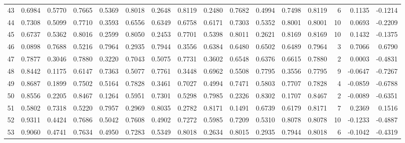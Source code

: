 \begin{tabular}{lrrrrrrrrrrrrrrr}
43  &      0.6984 &  0.5770 &  0.7665 &  0.5369 &  0.8018 &  0.2648 &  0.8119 &  0.2480 &  0.7682 &  0.4994 &   0.7498 &     0.8119 &      6 &                    0.1135 &                    -0.1214 \\
44  &      0.7308 &  0.5099 &  0.7710 &  0.3593 &  0.6556 &  0.6349 &  0.6758 &  0.6171 &  0.7303 &  0.5352 &   0.8001 &     0.8001 &     10 &                    0.0693 &                    -0.2209 \\
45  &      0.6737 &  0.5362 &  0.8016 &  0.2599 &  0.8050 &  0.2453 &  0.7701 &  0.5398 &  0.8011 &  0.2621 &   0.8169 &     0.8169 &     10 &                    0.1432 &                    -0.1375 \\
46  &      0.0898 &  0.7688 &  0.5216 &  0.7964 &  0.2935 &  0.7944 &  0.3556 &  0.6384 &  0.6480 &  0.6502 &   0.6489 &     0.7964 &      3 &                    0.7066 &                     0.6790 \\
47  &      0.7877 &  0.3046 &  0.7880 &  0.3220 &  0.7043 &  0.5075 &  0.7731 &  0.3602 &  0.6548 &  0.6376 &   0.6615 &     0.7880 &      2 &                    0.0003 &                    -0.4831 \\
48  &      0.8442 &  0.1175 &  0.6147 &  0.7363 &  0.5077 &  0.7761 &  0.3448 &  0.6962 &  0.5508 &  0.7795 &   0.3556 &     0.7795 &      9 &                   -0.0647 &                    -0.7267 \\
49  &      0.8687 &  0.1899 &  0.7502 &  0.5164 &  0.7828 &  0.3461 &  0.7027 &  0.4994 &  0.7471 &  0.5803 &   0.7707 &     0.7828 &      4 &                   -0.0859 &                    -0.6788 \\
50  &      0.8556 &  0.2205 &  0.8467 &  0.1264 &  0.5951 &  0.7301 &  0.5298 &  0.7985 &  0.2326 &  0.8302 &   0.1707 &     0.8467 &      2 &                   -0.0089 &                    -0.6351 \\
51  &      0.5802 &  0.7318 &  0.5220 &  0.7957 &  0.2969 &  0.8035 &  0.2782 &  0.8171 &  0.1491 &  0.6739 &   0.6179 &     0.8171 &      7 &                    0.2369 &                     0.1516 \\
52  &      0.9311 &  0.4424 &  0.7686 &  0.5042 &  0.7608 &  0.4902 &  0.7272 &  0.5985 &  0.7209 &  0.5310 &   0.8078 &     0.8078 &     10 &                   -0.1233 &                    -0.4887 \\
53  &      0.9060 &  0.4741 &  0.7634 &  0.4950 &  0.7283 &  0.5349 &  0.8018 &  0.2634 &  0.8015 &  0.2935 &   0.7944 &     0.8018 &      6 &                   -0.1042 &                    -0.4319 \\

\end{tabular}
